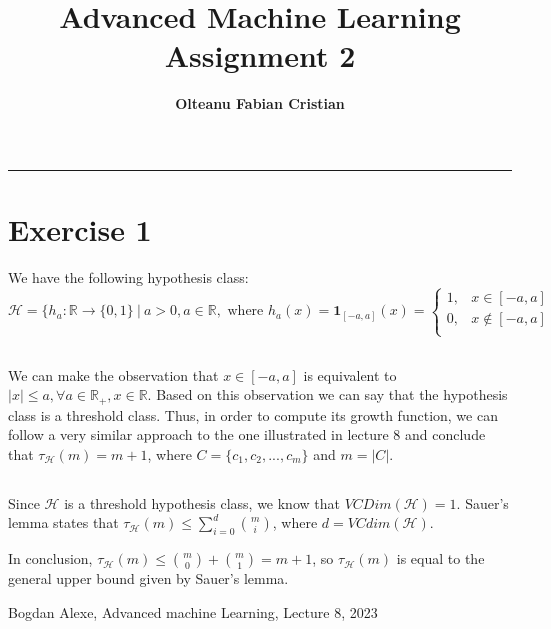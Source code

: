 \documentclass{article}
\author{\textbf{Olteanu Fabian Cristian}}
\affil{FMI, AI Master, Year 1
}
\title{\textbf{\huge Advanced Machine Learning Assignment 2}}
\date{}
\newcounter{lemma}
\begin{document}
\pagestyle{headings}	
\newpage
\setcounter{page}{1}
\renewcommand{\thepage}{\arabic{page}}


	
	
\setlength{\parskip}{0.5em}
	
\maketitle
	
\noindent\rule{15cm}{0.4pt}
\renewcommand{\thesubsection}{\thesection.\alph{subsection}}

\section{Exercise 1}
We have the following hypothesis class:
$$
\mathcal{H} = \{ h_{a} : \mathbb{R} \rightarrow \{0,1\}\ | \ a > 0, a\in \mathbb{R}, \text{\ where \ } 
h_{a}(x)= \mathbf{1}_{[-a,a]}(x) = \left\{
\begin{array}{ll}
      1, & x \in [-a,a]\\
      0, & x \not\in [-a,a] \\
\end{array}
\right. 
$$
\subsection{}
We can make the observation that $x\in[-a,a]$ is equivalent to $|x|\leq a, \forall a\in \mathbb{R}_{+}, x\in\mathbb{R}$. Based on this observation we can say that the hypothesis class is a threshold class.
Thus, in order to compute its growth function, we can follow a very similar approach to the one illustrated in lecture 8 \cite{AML8} and conclude that $\tau_\mathcal{H}(m) = m+1$, where $C=\{c_1,c_2,...,c_m\}$ and $m=|C|$.

\subsection{}
Since $\mathcal{H}$ is a threshold hypothesis class, we know that $VCDim(\mathcal{H})=1$. Sauer's lemma states that $\tau_\mathcal{H}(m)\leq \displaystyle\sum_{i=0}^d{m \choose i}$, where $d=VCdim(\mathcal{H})$.

In conclusion, $\tau_\mathcal{H}(m)\leq \displaystyle{m \choose 0} + \displaystyle{m \choose 1}= m+1$, so $\tau_\mathcal{H}(m)$ is equal to the general upper bound given by Sauer's lemma.

\newpage

\begin{thebibliography}{1.7} 
	 \color{cyan}Bogdan Alexe, Advanced machine Learning, Lecture 8, 2023 \color{black}
	
\end{thebibliography}
\end{document}
